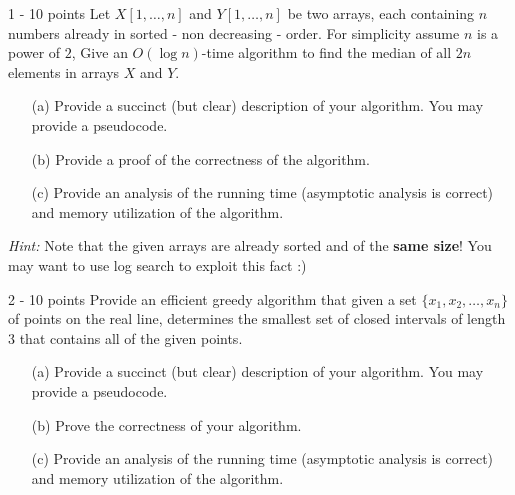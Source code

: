 \documentclass{common/cs157}
\begin{document}
\midtermpolicyremind{}

\begin{problem}{1 - 10 points}
Let $X[1,\ldots,n]$ and $Y[1,\ldots,n]$ be two arrays, each containing $n$ numbers already in sorted - non decreasing - order. For simplicity assume $n$ is a power of $2$, Give an $O(\log n)$-time algorithm to find the median of all $2n$ elements in arrays $X$ and $Y$.
\begin{enumerate}
    \item[(a)] Provide a succinct (but clear) description of your algorithm. You may provide a pseudocode.
    \item[(b)] Provide a proof of the correctness of the algorithm.
    \item[(c)] Provide an analysis of the running time (asymptotic analysis is correct) and memory utilization of the algorithm.
\end{enumerate}
\noindent \emph{Hint:} Note that the given arrays are already sorted and of the \textbf{same size}! You may want to use log search to exploit this fact :)
\end{problem}


\begin{problem}{2 - 10 points}
Provide an efficient greedy algorithm that given a set $\{x_1,x_2,\ldots,x_n\}$ of points on the real line, determines the smallest set of  closed intervals of length 3 that contains all of the given points.
\begin{enumerate}
    \item[(a)] Provide a succinct (but clear) description of your algorithm. You may provide a pseudocode.
    \item[(b)] Prove the correctness of your algorithm.
    \item[(c)] Provide an analysis of the running time (asymptotic analysis is correct) and memory utilization of the algorithm.
\end{enumerate}
\end{problem}
\end{document}
